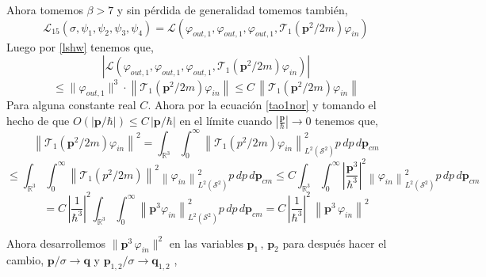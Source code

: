 \documentclass[12pt]{book}
\numberwithin{equation}{chapter}
\def\v{\mathbf}
\def\n{\noindent}
\def\R{\mathbb{R}}
\def\S{\mathcal{S}}
\def\T{\mathcal{T}}
\def\L{\mathcal{L}}
\def\vp{\varphi}
\def\P{\mathbf{p}}
\begin{document}
Ahora tomemos $\beta > 7$ y sin p\'erdida de generalidad tomemos tambi\'en,
\begin{equation}\label{1.4.1}
\L_{15}(\sigma,\psi_{1},\psi_{2},\psi_{3},\psi_{4})=\L \left(\vp_{out,1},\vp_{out,1},\vp_{out,1},\T_{1}(\P^{2}/2m)\vp_{in} \right)
\end{equation}
Luego por \eqref{lshw} tenemos que,
$$ \left| \L \left(\vp_{out,1},\vp_{out,1},\vp_{out,1},\T_{1}(\P^{2}/2m)\vp_{in} \right) \right| $$
\begin{equation}\label{1.4.2}
\leq \| \vp_{out,1} \|^{3}\cdot \left\| \T_{1}(\P^{2}/2m)\vp_{in} \right\| \leq C \, \left\| \T_{1}(\P^{2}/2m)\vp_{in} \right\|
\end{equation}
Para alguna constante real $C$. Ahora por la ecuaci\'on \eqref{tao1nor} y tomando el hecho de que $O(|\P/\hbar|)\leq C\, |\P/\hbar| $ en el l\'imite cuando $ \left| \frac{\P}{\hbar} \right| \rightarrow 0 $ tenemos que,
$$ \left\| \T_{1}(\P^{2}/2m)\vp_{in} \right\|^{2} = \int_{\R^{3}} \int_{0}^{\infty} \left\| \T_{1}(p^{2}/2m)\vp_{in} \right\|_{L^{2}(\S^{2})}^{2} p\, dp\, d\P_{cm} $$
$$\leq \int_{\R^{3}} \int_{0}^{\infty} \left\| \T_{1}(p^{2}/2m) \right\|^{2} \left\|\vp_{in} \right\|_{L^{2}(\S^{2})}^{2} p\, dp\, d\P_{cm}
\leq C \int_{\R^{3}} \int_{0}^{\infty} \left| \frac{\P^{3}}{\hbar^{3}} \right|^{2} \left\|\vp_{in} \right\|_{L^{2}(\S^{2})}^{2} p\, dp\, d\P_{cm} $$
$$= C\,\left|\frac{1}{\hbar^{3}} \right|^{2} \int_{\R^{3}} \int_{0}^{\infty}  \left\| \P^{3}  \vp_{in} \right\|_{L^{2}(\S^{2})}^{2} p\, dp\, d\P_{cm} = C\, \left|\frac{1}{\hbar^{3}} \right|^{2} \, \left\| \P^{3}\, \vp_{in} \right\|^{2} $$

\n Ahora desarrollemos $\| \P^{3} \, \vp_{in}  \|^{2}$ en las variables $\P_{1}\,,\, \P_{2}$ para despu\'es hacer el cambio, $ \P/\sigma \rightarrow \v{q} $ y $ \P_{1,2}/\sigma \rightarrow \v{q}_{1,2} $ ,
\end{document}
